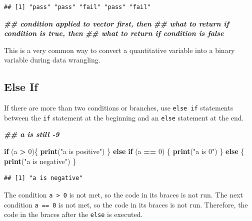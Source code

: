 \documentclass[
]{book}
\newenvironment{Shaded}{\begin{snugshade}}{\end{snugshade}}
\newcommand{\ControlFlowTok}[1]{\textcolor[rgb]{0.13,0.29,0.53}{\textbf{#1}}}
\newcommand{\DecValTok}[1]{\textcolor[rgb]{0.00,0.00,0.81}{#1}}
\newcommand{\DocumentationTok}[1]{\textcolor[rgb]{0.56,0.35,0.01}{\textbf{\textit{#1}}}}
\newcommand{\FunctionTok}[1]{\textcolor[rgb]{0.13,0.29,0.53}{\textbf{#1}}}
\newcommand{\NormalTok}[1]{#1}
\newcommand{\SpecialCharTok}[1]{\textcolor[rgb]{0.81,0.36,0.00}{\textbf{#1}}}
\newcommand{\StringTok}[1]{\textcolor[rgb]{0.31,0.60,0.02}{#1}}
\theoremstyle{definition}
\theoremstyle{definition}
\theoremstyle{definition}
\theoremstyle{definition}
\theoremstyle{remark}
\begin{document}
\begin{verbatim}
## [1] "pass" "pass" "fail" "pass" "fail"
\end{verbatim}

\begin{Shaded}
\begin{Highlighting}[]
\DocumentationTok{\#\# condition applied to vector first, then}
\DocumentationTok{\#\# what to return if condition is true, then}
\DocumentationTok{\#\# what to return if condition is false}
\end{Highlighting}
\end{Shaded}

This is a very common way to convert a quantitative variable into a binary variable during data wrangling.

\hypertarget{else-if}{%
\subsection{Else If}\label{else-if}}

If there are more than two conditions or branches, use \texttt{else\ if} statements between the \texttt{if} statement at the beginning and an \texttt{else} statement at the end.

\begin{Shaded}
\begin{Highlighting}[]
\DocumentationTok{\#\# a is still {-}9}

\ControlFlowTok{if}\NormalTok{ (a }\SpecialCharTok{\textgreater{}} \DecValTok{0}\NormalTok{)\{}
  \FunctionTok{print}\NormalTok{(}\StringTok{"a is positive"}\NormalTok{)}
\NormalTok{\} }\ControlFlowTok{else} \ControlFlowTok{if}\NormalTok{ (a }\SpecialCharTok{==} \DecValTok{0}\NormalTok{) \{}
  \FunctionTok{print}\NormalTok{(}\StringTok{"a is 0"}\NormalTok{)}
\NormalTok{\} }\ControlFlowTok{else}\NormalTok{ \{}
  \FunctionTok{print}\NormalTok{(}\StringTok{"a is negative"}\NormalTok{)}
\NormalTok{\}}
\end{Highlighting}
\end{Shaded}

\begin{verbatim}
## [1] "a is negative"
\end{verbatim}

The condition \texttt{a\ \textgreater{}\ 0} is not met, so the code in its braces is not run. The next condition \texttt{a\ ==\ 0} is not met, so the code in its braces is not run. Therefore, the code in the braces after the \texttt{else} is executed.
\end{document}
